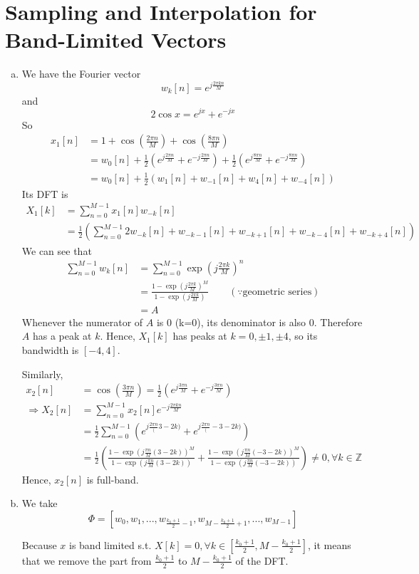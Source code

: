 \section{Sampling and Interpolation for Band-Limited Vectors}\label{sec:p1}

\begin{enumerate}[(a)]
\item We have the Fourier vector
\[w_k[n] = e^{j\frac{2\pi k n}{M}}\]
and
\[2\cos x = e^{jx} + e^{-jx}\]
So
\begin{align*}
	x_1[n] 
	&= 1 + \cos\left(\frac{2\pi n}{M}\right) + \cos\left(\frac{8\pi n}{M}\right) \\
	&= w_0[n] + \frac{1}{2}\left(e^{j\frac{2\pi n}{M}} + e^{-j\frac{2 \pi n}{M}}\right) + \frac{1}{2}\left(e^{j\frac{8\pi n}{M}} + e^{-j\frac{8 \pi n}{M}}\right) \\
	&= w_0[n] + \frac{1}{2}\left(w_1[n] + w_{-1}[n] + w_4[n] + w_{-4}[n] \right)
\end{align*}
Its DFT is
\begin{align*}
	X_1[k] 
	&= \sum_{n=0}^{M-1} x_1[n] w_{-k}[n] \\
	&= \frac{1}{2} \left( \sum_{n=0}^{M-1} 2w_{-k}[n] + w_{-k-1}[n] + w_{-k+1}[n] + w_{-k-4}[n] + w_{-k+4}[n]\right)
\end{align*}
We can see that
\begin{align*}
	\sum_{n=0}^{M-1} w_k[n]
	&= \sum_{n=0}^{M-1} \exp\left(j\frac{2 \pi k}{M}\right)^n \\
	&= \frac{1-\exp\left(j\frac{2 \pi k}{M}\right)^M}{1 - \exp\left(j\frac{2 \pi k}{M}\right)} \qquad (\because \text{geometric series}) \\
	&= A
\end{align*}
Whenever the numerator of $A$ is 0 (k=0), its denominator is also 0. Therefore $A$ has a peak at $k$. Hence, $X_1[k]$ has peaks at $k=0,\pm1, \pm4$, so its bandwidth is $[-4, 4]$.

Similarly,
\begin{align*}
	x_2[n]
	&= \cos\left(\frac{3 \pi n}{M}\right) = \frac{1}{2}\left(e^{j\frac{3 \pi n}{M}} + e^{-j\frac{3 \pi n}{M}}\right) \\
	\Rightarrow X_2[n]
	&= \sum_{n=0}^{M-1} x_2[n] e^{-j\frac{2 \pi k n}{M}} \\
	&= \frac{1}{2} \sum_{n=0}^{M-1} \left( e^{j\frac{2 \pi n}(3-2k)} + e^{j\frac{2 \pi n}(-3-2k)} \right) \\
	&= \frac{1}{2} \left( \frac{1 - \exp\left(j\frac{\pi n}{M}(3-2k)\right)^M}{1 - \exp\left(j\frac{\pi n}{M}(3-2k)\right)} + \frac{1 - \exp\left(j\frac{\pi n}{M}(-3-2k)\right)^M}{1 - \exp\left(j\frac{\pi n}{M}(-3-2k)\right)} \right) \neq 0, \forall k \in \mathbb{Z}
\end{align*}
Hence, $x_2[n]$ is full-band.

\item We take
\[\Phi = \left[w_0, w_1, ..., w_{\frac{k_0+1}{2}-1}, w_{M-\frac{k_0+1}{2}+1},..., w_{M-1}\right]\]

Because $x$ is band limited s.t. $X[k]=0, \forall k \in \left[\frac{k_0+1}{2}, M-\frac{k_0+1}{2}\right]$, it means that we remove the part from $\frac{k_0+1}{2}$ to $M-\frac{k_0+1}{2}$ of the DFT.
\end{enumerate}